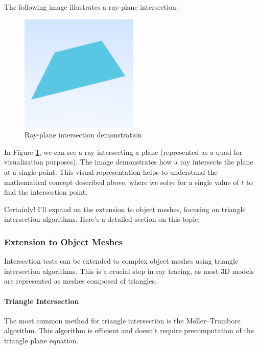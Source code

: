 \documentclass[12pt]{article}
\begin{document}
The following image illustrates a ray-plane intersection:

\begin{figure}[H]
    \centering
    \includegraphics[width=0.5\textwidth]{images/ray_quad_intersection.png}
    \caption{Ray-plane intersection demonstration}
    \label{fig:rayplaneintersection}
\end{figure}

In Figure \ref{fig:rayplaneintersection}, we can see a ray intersecting a plane (represented as a quad for visualization purposes). The image demonstrates how a ray intersects the plane at a single point. This visual representation helps to understand the mathematical concept described above, where we solve for a single value of \(t\) to find the intersection point.

Certainly! I'll expand on the extension to object meshes, focusing on triangle intersection algorithms. Here's a detailed section on this topic:

\subsubsection{Extension to Object Meshes}

Intersection tests can be extended to complex object meshes using triangle intersection algorithms. This is a crucial step in ray tracing, as most 3D models are represented as meshes composed of triangles.

\paragraph{Triangle Intersection}

The most common method for triangle intersection is the Möller–Trumbore algorithm. This algorithm is efficient and doesn't require precomputation of the triangle plane equation.
\end{document}
